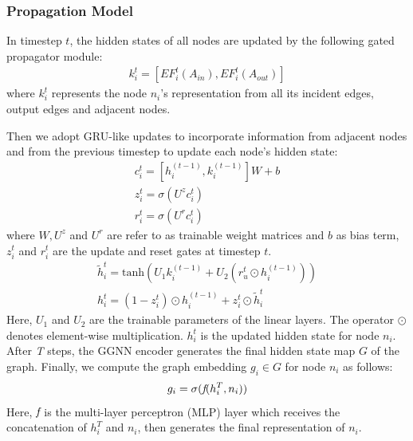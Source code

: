 \documentclass[letterpaper]{article} %
\begin{document}
\subsubsection{Propagation Model}

In timestep $t$, the hidden states of all nodes are updated by the following gated propagator module:
\begin{gather}
    k_{i}^t = [EF_i^t(A_{in}), EF_i^t(A_{out})]
\end{gather}
where $k_{i}^t$ represents the node ${n}_i$'s representation from all its incident edges, output edges and adjacent nodes.

Then we adopt GRU-like updates to incorporate information from adjacent nodes and from the previous timestep to update each node’s hidden state:
\begin{gather}
    c_i^t = [h_i^{(t-1)}, k_{i}^{(t-1)}] W + b\\
    z_i^t = \sigma(U^z c_i^t) \\
    r_i^t = \sigma(U^r c_i^t)
\end{gather}
where $W, U^z$ and $U^r$ are refer to as trainable weight matrices and $b$ as bias term, $z_i^t$ and $r_i^t$ are the update and reset gates at timestep $t$.
\begin{gather}
    \tilde{h}_i^t = \text{tanh}(U_1 k_{i}^{(t-1)} + U_2(r_u^t \odot h_i^{(t-1)}))\\
    h_i^t = (1-z_i^t)\odot h_i^{(t-1)} + z_i^t\odot \tilde{h}_i^t
\end{gather}
Here, $U_1$ and $U_2$ are the trainable parameters of the linear layers. The operator $\odot$ denotes element-wise multiplication. $h_i^t$ is the updated hidden state for node ${n}_i$. After \emph{T}  steps, the GGNN encoder generates the final hidden state map $G$ of the graph. Finally, we compute the graph embedding $g_i \in G$ for node ${n}_i$ as follows:
\begin{equation}
    g_i = \sigma( \emph{f}(h_i^T, n_i))
\end{equation}
Here, $\emph{f}$ is the multi-layer perceptron (MLP) layer which receives the concatenation of $h_i^T$ and $n_i$, then generates the final representation of ${n}_i$. 
\end{document}
